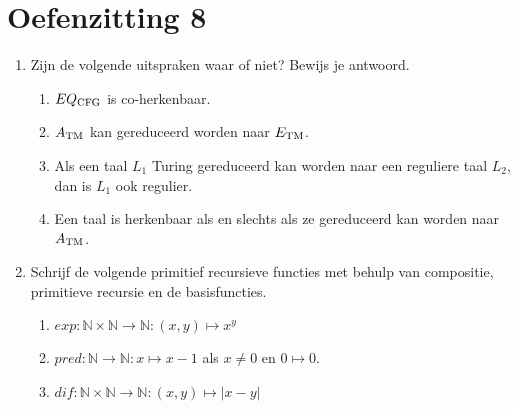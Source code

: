 \documentclass[a4paper]{article}
\newcommand{\N}{\mathbb{N}}
\begin{document}
\pagestyle{empty}
\section*{Oefenzitting 8}


\begin{enumerate}
   \item Zijn de volgende uitspraken waar of niet? Bewijs je antwoord.
		   \begin{enumerate}
			   \item $EQ_{\rm CFG}$ is co-herkenbaar.
				\item $A_{\rm TM}$ kan gereduceerd worden naar $E_{\rm TM}$.
				\item Als een taal $L_1$ Turing gereduceerd kan worden naar een reguliere taal $L_2$, dan is $L_1$ ook regulier.
				\item Een taal is herkenbaar als en slechts als ze gereduceerd kan worden naar $A_{\rm TM}$.
			\end{enumerate}
	\item Schrijf de volgende primitief recursieve functies met behulp van compositie, primitieve recursie en de basisfuncties.
			\begin{enumerate}
				\item $exp : \N \times \N \to \N : (x,y) \mapsto x^y$
				\item $pred : \N \to \N : x \mapsto x - 1$ als $x \neq 0$ en $0 \mapsto 0$.
				\item $dif : \N \times \N \to \N : (x,y) \mapsto | x - y |$
			\end{enumerate}
\end{enumerate}
\end{document}
